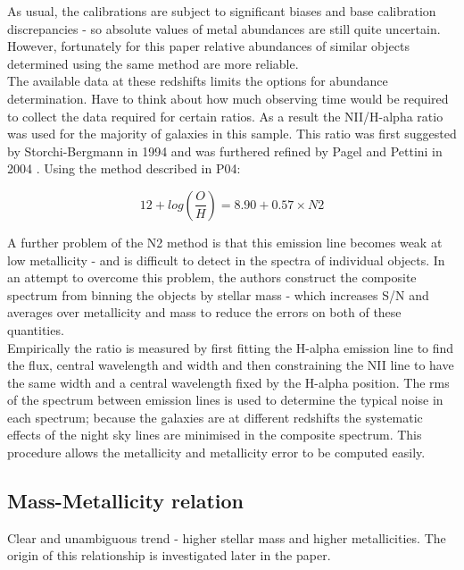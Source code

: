 \documentclass{literature}
\begin{document}
As usual, the calibrations are subject to significant biases and base calibration discrepancies - so absolute values of metal abundances are still quite uncertain. However, fortunately for this paper relative abundances of similar objects determined using the same method are more reliable. \\ 
The available data at these redshifts limits the options for abundance determination. Have to think about how much observing time would be required to collect the data required for certain ratios. As a result the NII/H-alpha ratio was used for the majority of galaxies in this sample. This ratio was first suggested by Storchi-Bergmann in 1994 \citep{Storchi_1994} and was furthered refined by Pagel and Pettini in 2004 \citep{Pettini_2004}. Using the method described in P04: 

\begin{equation}
	12 + log(\frac{O}{H}) = 8.90 + 0.57 \times N2
\end{equation}

A further problem of the N2 method is that this emission line becomes weak at low metallicity - and is difficult to detect in the spectra of individual objects. In an attempt to overcome this problem, the authors construct the composite spectrum from binning the objects by stellar mass - which increases S/N and averages over metallicity and mass to reduce the errors on both of these quantities. \\ 

Empirically the ratio is measured by first fitting the H-alpha emission line to find the flux, central wavelength and width and then constraining the NII line to have the same width and a central wavelength fixed by the H-alpha position. The rms of the spectrum between emission lines is used to determine the typical noise in each spectrum; because the galaxies are at different redshifts the systematic effects of the night sky lines are minimised in the composite spectrum. This procedure allows the metallicity and metallicity error to be computed easily. 

\subsection{Mass-Metallicity relation}
Clear and unambiguous trend - higher stellar mass and higher metallicities. The origin of this relationship is investigated later in the paper. 
\end{document}
